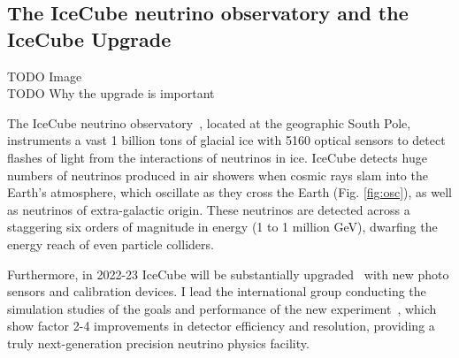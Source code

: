 \documentclass[a4paper,11pt]{article}
\begin{document}
\subsection{The IceCube neutrino observatory and the IceCube Upgrade}

TODO Image \\

TODO Why the upgrade is important \\



The IceCube neutrino observatory~\cite{Aartsen_2017}, located at the geographic South Pole, instruments a vast 1 billion tons of glacial ice with 5160 optical sensors to detect flashes of light from the interactions of neutrinos in ice. IceCube detects huge numbers of neutrinos produced in air showers when cosmic rays slam into the Earth's atmosphere, which oscillate as they cross the Earth (Fig. \ref{fig:osc}), as well as neutrinos of extra-galactic origin. These neutrinos are detected across a staggering six orders of magnitude in energy (1 to 1 million GeV), dwarfing the energy reach of even particle colliders. 


Furthermore, in 2022-23 IceCube will be substantially upgraded~\cite{IceCubeUpgrade_ICRC2019} with new photo sensors and calibration devices. I lead the international group conducting the simulation studies of the goals and performance of the new experiment~\cite{IceCubeUpgrade_ICRC2019, NuFactProceedings}, which show factor 2-4 improvements in detector efficiency and resolution, providing a truly next-generation precision neutrino physics facility.



\end{document}

